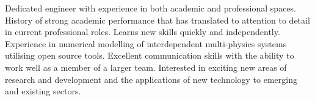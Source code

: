 %
%
%
\par{
Dedicated engineer with experience in both academic and professional spaces. History of strong academic performance that has translated to attention to detail in current professional roles. Learns new skills quickly and independently. Experience in numerical modelling of interdependent multi-physics systems utilising open source tools. Excellent communication skills with the ability to work well as a member of a larger team. Interested in exciting new areas of research and development and the applications of new technology to emerging and existing sectors.
}